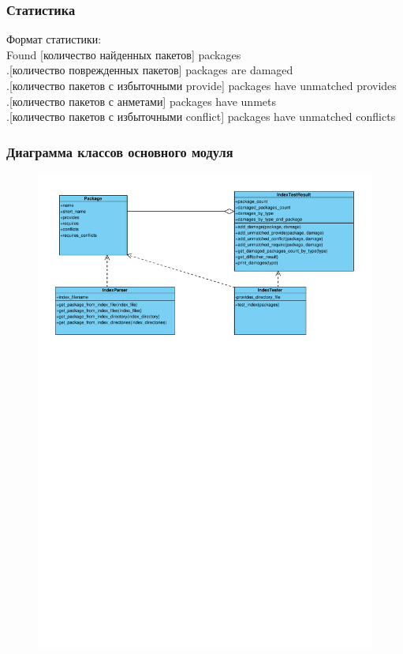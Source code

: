 \documentclass{beamer}
\begin{document}
\begin{frame}
\frametitle{Статистика}
Формат статистики:\\
\vspace{0.5cm}
Found [количество найденных пакетов] packages\\
.[количество поврежденных пакетов] packages are damaged\\
.[количество пакетов с избыточными provide] packages have unmatched provides\\
.[количество пакетов с анметами] packages have unmets\\
.[количество пакетов с избыточными conflict] packages have unmatched conflicts\\

\end{frame}

\begin{frame}
\frametitle{Диаграмма классов основного модуля}

\begin{figure}
\begin{center}
\vspace{0cm}
\hspace*{-1cm} \includegraphics[scale=0.6]{../resources/uml/ds_test_class_diagram.pdf}
\end{center}
\end{figure}

\end{frame}
\end{document}
